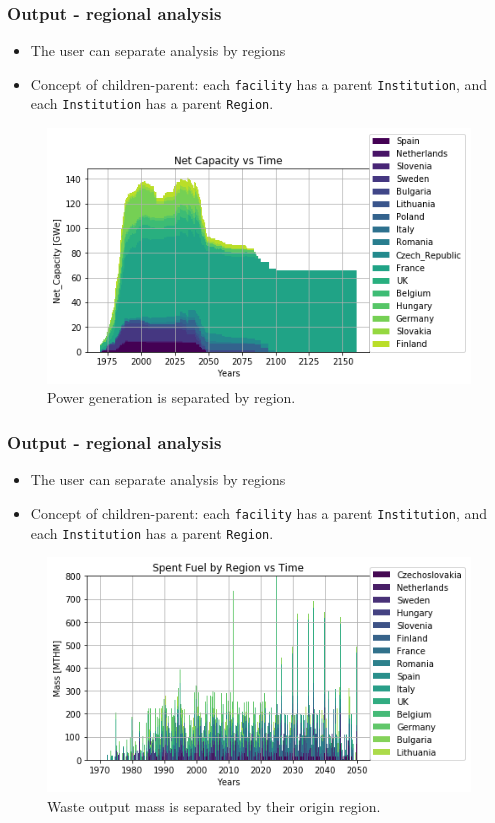 \begin{frame}
    \frametitle{Output - regional analysis}
    \begin{itemize}
        \item The user can separate analysis by regions
        \item Concept of children-parent: each \texttt{facility} has a parent \texttt{Institution}, and each \texttt{Institution} has a parent \texttt{Region}.
    \end{itemize}
    \begin{figure}[htbp!]
        \begin{center}
                \includegraphics[width=.8\textwidth]{./images/sim_output/france/onesim.png}
        \end{center}
    \caption{Power generation is separated by region.}
    \end{figure}
\end{frame}

\begin{frame}
    \frametitle{Output - regional analysis}
    \begin{itemize}
        \item The user can separate analysis by regions
        \item Concept of children-parent: each \texttt{facility} has a parent \texttt{Institution}, and each \texttt{Institution} has a parent \texttt{Region}.
    \end{itemize}
    \begin{figure}[htbp!]
        \begin{center}
                \includegraphics[width=.8\textwidth]{./images/sim_output/france/regional_snf.png}
        \end{center}
    \caption{Waste output mass is separated by their origin region.}
    \end{figure}
\end{frame}

